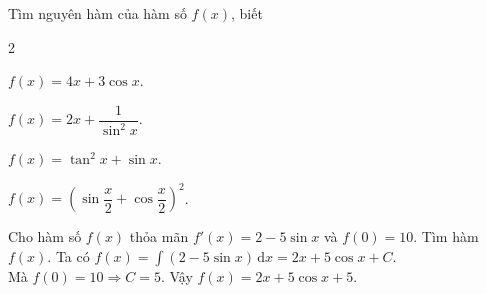 \begin{vd}
	Tìm nguyên hàm của hàm số $f(x)$, biết
	\begin{enumEX}[a)]{2}
		\item $ f(x)=4x+3\cos x$. 
		\item $ f(x)=2 x+\dfrac{1}{\sin ^{2} x}$.
		\item $ f(x)=\tan^2x+\sin x$.
		\item $f(x)=\left(\sin \dfrac{x}{2}+\cos \dfrac{x}{2}\right)^2$.
	\end{enumEX}
\end{vd}

\begin{vd}
	Cho hàm số $f(x)$ thỏa mãn $f'(x)=2-5\sin x$ và $f(0)=10$. Tìm hàm $f(x)$.
	\loigiai
	{
		Ta có $f\left(x\right)=\int \left(2-5\sin x\right)\mathrm{\,d}x=2x+5\cos x+C$.\\
		Mà $f(0)=10 \Rightarrow C=5$. Vậy $f(x)=2x+5\cos x+5$.
	}
\end{vd}

